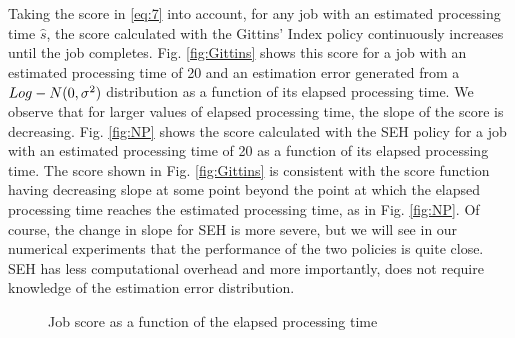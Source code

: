 Taking the score in \eqref{eq:7} into account, for any job with an estimated processing time $\hat s$, the score calculated with the Gittins' Index policy continuously increases until the job completes. Fig. \ref{fig:Gittins} shows this score for a job with an estimated processing time of 20 and an estimation error generated from a $Log - N(0,{\rm{}}{\sigma ^2})$ distribution as a function of its elapsed processing time. We observe that for larger values of elapsed processing time, the slope of the score is decreasing. Fig. \ref{fig:NP} shows the score calculated with the SEH policy for a job with an estimated processing time of 20 as a function of its elapsed processing time. The score shown in Fig. \ref{fig:Gittins} is consistent with the score function having decreasing slope at some point beyond the point at which the elapsed processing time reaches the estimated processing time, as in Fig. \ref{fig:NP}. Of course, the change in slope for SEH is more severe, but we will see in our numerical experiments that the performance of the two policies is quite close. SEH has less computational overhead and more importantly, does not require knowledge of the estimation error distribution.



\begin{figure}[t]
\centering

\caption{\label{fig:Gittins_VS_SEH} Job score as a function of the elapsed processing time } 
\end{figure}


